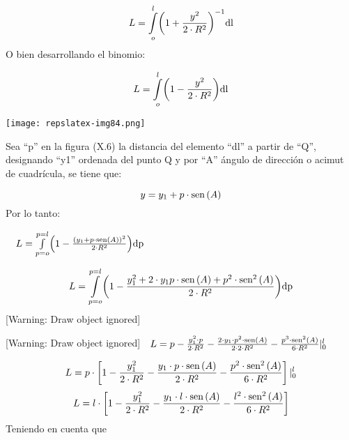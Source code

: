 \documentclass{tufte-book}
\newcommand\normalsubformula[1]{\text{\mathversion{normal}$#1$}}
\begin{document}
\begin{equation*}
{L=\overset{{l}}{\underset{{o}}{\int }}{\left(1+\frac{y^{{2}}}{2\cdot
R^{{2}}}\right)}^{{-1}}\normalsubformula{\text{dl}}}
\end{equation*}
O bien desarrollando el binomio:

\begin{equation*}
{L=\overset{{l}}{\underset{{o}}{\int }}{\left(1-\frac{y^{{2}}}{2\cdot
R^{{2}}}\right)}\normalsubformula{\text{dl}}}
\end{equation*}

\begin{marginfigure}
\texttt{[image: repslatex-img84.png]}
\end{marginfigure}
 

Sea {\textquotedblleft}p{\textquotedblright} en la figura (X.6) la
distancia del elemento {\textquotedblleft}dl{\textquotedblright} a
partir de {\textquotedblleft}Q{\textquotedblright}, designando
{\textquotedblleft}y1{\textquotedblright} ordenada del punto Q y  por
{\textquotedblleft}A{\textquotedblright} ángulo de dirección o
acimut de cuadrícula, se tiene que:

\begin{equation*}
{y=y_{{1}}+p\cdot \normalsubformula{\text{sen}}\left(A\right)}
\end{equation*}
Por lo tanto:

\ \  ${L=\overset{{p=l}}{\underset{{p=o}}{\int
}}{\left(1-\frac{\left(y_{{1}}+p\cdot
\normalsubformula{\text{sen}}\left(A\right)\right)^{{2}}}{2\cdot
R^{{2}}}\right)}\normalsubformula{\text{dp}}}$

\begin{equation*}
{L=\overset{{p=l}}{\underset{{p=o}}{\int
}}{\left(1-\frac{y_{{1}}^{{2}}+2\cdot y_{{1}}p\cdot
\normalsubformula{\text{sen}}\left(A\right)+p^{{2}}\cdot
\normalsubformula{\text{sen}}^{{2}}\left(A\right)}{2\cdot
R^{{2}}}\right)}\normalsubformula{\text{dp}}}
\end{equation*}
[Warning: Draw object ignored]

[Warning: Draw object ignored]\ \  ${L=p-\frac{y_{{1}}^{{2}}\cdot
p}{2\cdot R^{{2}}}-\frac{2\cdot y_{{1}}\cdot p^{{2}}\cdot
\normalsubformula{\text{sen}}\left(A\right)}{2\cdot 2\cdot
R^{{2}}}-\frac{p^{{3}}\cdot
\normalsubformula{\text{sen}}^{{2}}\left(A\right)}{6\cdot
R^{{2}}}|_{{0}}^{{l}}}$

\begin{equation*}
{L=p\cdot \left[1-\frac{y_{{1}}^{{2}}}{2\cdot
R^{{2}}}-\frac{y_{{1}}\cdot p\cdot
\normalsubformula{\text{sen}}\left(A\right)}{2\cdot
R^{{2}}}-\frac{p^{{2}}\cdot
\normalsubformula{\text{sen}}^{{2}}\left(A\right)}{6\cdot
R^{{2}}}\right]|_{{0}}^{{l}}}
\end{equation*}
\begin{equation*}
{L=l\cdot \left[1-\frac{y_{{1}}^{{2}}}{2\cdot
R^{{2}}}-\frac{y_{{1}}\cdot l\cdot
\normalsubformula{\text{sen}}\left(A\right)}{2\cdot
R^{{2}}}-\frac{l^{{2}}\cdot
\normalsubformula{\text{sen}}^{{2}}\left(A\right)}{6\cdot
R^{{2}}}\right]}
\end{equation*}
Teniendo en cuenta que
\end{document}
